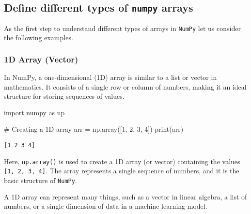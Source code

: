 \documentclass[
  letterpaper,
  DIV=11,
  numbers=noendperiod]{scrreprt}
\newenvironment{Shaded}{\begin{snugshade}}{\end{snugshade}}
\newcommand{\BuiltInTok}[1]{\textcolor[rgb]{0.00,0.23,0.31}{#1}}
\newcommand{\CommentTok}[1]{\textcolor[rgb]{0.37,0.37,0.37}{#1}}
\newcommand{\DecValTok}[1]{\textcolor[rgb]{0.68,0.00,0.00}{#1}}
\newcommand{\ImportTok}[1]{\textcolor[rgb]{0.00,0.46,0.62}{#1}}
\newcommand{\NormalTok}[1]{\textcolor[rgb]{0.00,0.23,0.31}{#1}}
\newcommand{\OperatorTok}[1]{\textcolor[rgb]{0.37,0.37,0.37}{#1}}
\theoremstyle{plain}
\theoremstyle{definition}
\theoremstyle{remark}
\begin{document}
\subsection{\texorpdfstring{Define different types of \texttt{numpy}
arrays}{Define different types of numpy arrays}}\label{define-different-types-of-numpy-arrays}

As the first step to understand different types of arrays in
\texttt{NumPy} let us consider the following examples.

\subsubsection{1D Array (Vector)}\label{d-array-vector}

In NumPy, a one-dimensional (1D) array is similar to a list or vector in
mathematics. It consists of a single row or column of numbers, making it
an ideal structure for storing sequences of values.

\begin{Shaded}
\begin{Highlighting}[]
\ImportTok{import}\NormalTok{ numpy }\ImportTok{as}\NormalTok{ np}

\CommentTok{\# Creating a 1D array}
\NormalTok{arr }\OperatorTok{=}\NormalTok{ np.array([}\DecValTok{1}\NormalTok{, }\DecValTok{2}\NormalTok{, }\DecValTok{3}\NormalTok{, }\DecValTok{4}\NormalTok{])}
\BuiltInTok{print}\NormalTok{(arr)}
\end{Highlighting}
\end{Shaded}

\begin{verbatim}
[1 2 3 4]
\end{verbatim}

Here, \texttt{np.array()} is used to create a 1D array (or vector)
containing the values \texttt{{[}1,\ 2,\ 3,\ 4{]}}. The array represents
a single sequence of numbers, and it is the basic structure of
\texttt{NumPy}.

\begin{tcolorbox}[enhanced jigsaw, leftrule=.75mm, bottomtitle=1mm, colback=white, toptitle=1mm, opacitybacktitle=0.6, toprule=.15mm, colbacktitle=quarto-callout-note-color!10!white, arc=.35mm, colframe=quarto-callout-note-color-frame, title=\textcolor{quarto-callout-note-color}{\faInfo}\hspace{0.5em}{Use:}, titlerule=0mm, rightrule=.15mm, left=2mm, bottomrule=.15mm, breakable, coltitle=black, opacityback=0]

A 1D array can represent many things, such as a vector in linear
algebra, a list of numbers, or a single dimension of data in a machine
learning model.

\end{tcolorbox}
\end{document}
